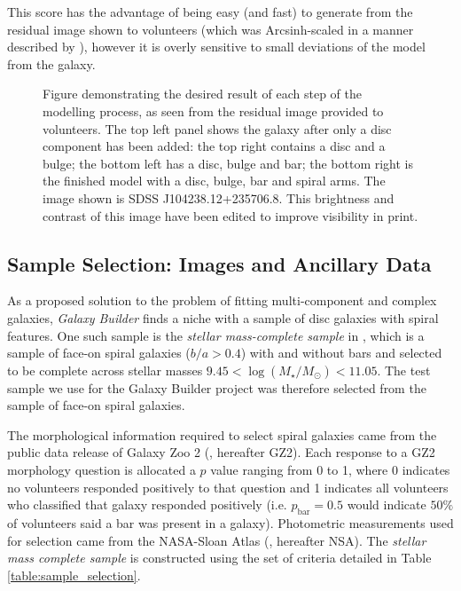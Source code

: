 \documentclass[trackchanges]{aastex63}
\begin{document}
This score has the advantage of being easy (and fast) to generate from the residual image shown to volunteers (which was Arcsinh-scaled in a manner described by \citealt{Lupton2003:astro-ph/0312483v1}), however it is overly sensitive to small deviations of the model from the galaxy.

\begin{figure}
  \caption{Figure demonstrating the desired result of each step of the modelling process, as seen from the residual image provided to volunteers. The top left panel shows the galaxy after only a disc component has been added: the top right contains a disc and a bulge; the bottom left has a disc, bulge and bar; the bottom right is the finished model with a disc, bulge, bar and spiral arms. The image shown is SDSS J104238.12+235706.8. This brightness and contrast of this image have been edited to improve visibility in print.}
  \label{fig:residualsStepByStep}
\end{figure}


\subsection{Sample Selection: Images and Ancillary Data}
\label{sec:data}

As a proposed solution to the problem of fitting multi-component and complex galaxies, \textit{Galaxy Builder} finds a niche with a sample of disc galaxies with spiral features. One such sample is the \textit{stellar mass-complete sample} in \citet{2017MNRAS.472.2263H}, which is a sample of  face-on spiral galaxies ($b/a > 0.4$) with and without bars and selected to be complete across stellar masses $9.45 < \log(M_\star / M_\odot) < 11.05$. The test sample we use for the Galaxy Builder project was therefore selected from the \citet{2017MNRAS.472.2263H} sample of  face-on spiral galaxies.

The morphological information required to select spiral galaxies came from the public data release of Galaxy Zoo 2 (\citealt{Willett2013:1308.3496v2}, hereafter GZ2). Each response to a GZ2 morphology question is allocated a $p$ value ranging from 0 to 1, where 0 indicates no volunteers responded positively to that question and 1 indicates all volunteers who classified that galaxy responded positively (i.e. $p_\text{bar} = 0.5$ would indicate $50\%$ of volunteers said a bar was present in a galaxy). Photometric measurements used for selection came from the NASA-Sloan Atlas (\citealt{2011AJ....142...31B}, hereafter NSA). The \textit{stellar mass complete sample} is constructed using the set of criteria detailed in Table \ref{table:sample_selection}.
\end{document}
